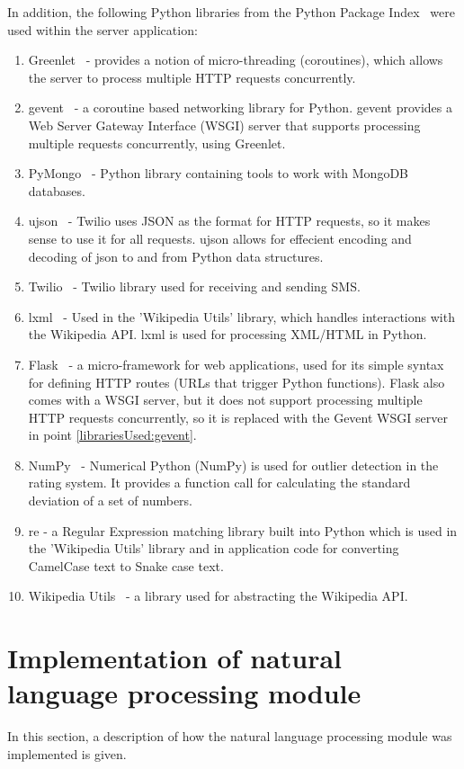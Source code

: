 \documentclass[authoryearcitations]{UoYCSproject}
\begin{document}
In addition, the following Python libraries from the Python Package Index~\cite{pypi} were used within the server application:
\begin{enumerate}
    \item Greenlet~\cite{libraryGreenlet} - provides a notion of micro-threading (coroutines), which allows the server to process multiple HTTP requests concurrently.
    \item gevent~\cite{libraryGevent} \label{librariesUsed:gevent} - a coroutine based networking library for Python. gevent provides a Web Server Gateway Interface (WSGI) server that supports processing multiple requests concurrently, using Greenlet.
    \item PyMongo~\cite{libraryPyMongo} - Python library containing tools to work with MongoDB databases.
    \item ujson~\cite{libraryUjson} - Twilio uses JSON as the format for HTTP requests, so it makes sense to use it for all requests. ujson allows for effecient encoding and decoding of json to and from Python data structures.
    \item Twilio~\cite{libraryTwilio} - Twilio library used for receiving and sending SMS.
    \item lxml~\cite{libraryLxml} - Used in the 'Wikipedia Utils' library, which handles interactions with the Wikipedia API. lxml is used for processing XML/HTML in Python.
    \item Flask~\cite{libraryFlask} - a micro-framework for web applications, used for its simple syntax for defining HTTP routes (URLs that trigger Python functions). Flask also comes with a WSGI server, but it does not support processing multiple HTTP requests concurrently, so it is replaced with the Gevent WSGI server in point \ref{librariesUsed:gevent}.
    \item NumPy~\cite{libraryNumPy} - Numerical Python (NumPy) is used for outlier detection in the rating system. It provides a function call for calculating the standard deviation of a set of numbers.
    \item re - a Regular Expression matching library built into Python which is used in the 'Wikipedia Utils' library and in application code for converting CamelCase text to Snake case text.
    \item Wikipedia Utils~\cite{libraryWikipediaUtils} - a library used for abstracting the Wikipedia API.
\end{enumerate}


\section{Implementation of natural language processing module}
In this section, a description of how the natural language processing module was implemented is given.
\end{document}

